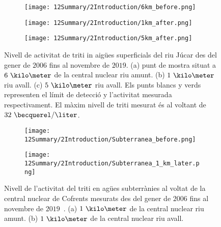 \begin{figure}
\centering
    \begin{subfigure}[b]{0.7\textwidth}
    \centering
    \texttt{[image: 12Summary/2Introduction/6km\_before.png]}  
    \caption{\label{subfig:TritiumL6kB}}
    \end{subfigure}
    \hfill
    \begin{subfigure}[b]{0.7\textwidth}
    \centering
    \texttt{[image: 12Summary/2Introduction/1km\_after.png]}  
    \caption{\label{subfig:TritiumL1kA}}
    \end{subfigure}
    \hfill
    \begin{subfigure}[b]{0.7\textwidth}
    \centering
    \texttt{[image: 12Summary/2Introduction/5km\_after.png]}  
    \caption{\label{subfig:TritiumL5kA}}
    \end{subfigure}
 \caption{Nivell de activitat de triti in aigües superficials del riu Júcar des del gener de $2006$ fins al novembre de $2019$. (a) punt de mostra situat a $6~\kilo\meter$ de la central nuclear riu amunt. (b) $1~\kilo\meter$ riu avall. (c) $5~\kilo\meter$ riu avall. Els punts blancs y verds representen el límit de detecció y l'activitat mesurada respectivament. El màxim nivell de triti mesurat és al voltant de $32~\becquerel/\liter$.~\cite{REM}}
 \label{fig:MesuresSuperficialsCofrents}
\end{figure}

\begin{figure}
\centering
    \begin{subfigure}[b]{0.7\textwidth}
    \centering
    \texttt{[image: 12Summary/2Introduction/Subterranea\_before.png]}  
    \caption{\label{subfig:TritiumLG1kB}}
    \end{subfigure}
    \hfill
    \begin{subfigure}[b]{0.7\textwidth}
    \centering
    \texttt{[image: 12Summary/2Introduction/Subterranea\_1\_km\_later.png]}  
    \caption{\label{subfig:TritiumLG1kA}}
    \end{subfigure}
 \caption{Nivell de l'activitat del triti en agües subterrànies al voltat de la central nuclear de Cofrents mesurats des del gener de $2006$ fins al novembre de $2019$~\cite{REM}. (a) $1~\kilo\meter$ de la central nuclear riu amunt. (b) $1~\kilo\meter$ de la central nuclear riu avall.~\cite{REM}}
 \label{fig:MesuresSuperterraniesCofrents}
\end{figure}

